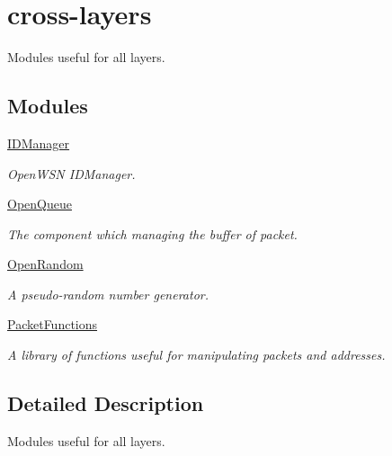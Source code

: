 \hypertarget{group__cross-layers}{}\section{cross-\/layers}
\label{group__cross-layers}


Modules useful for all layers.  


\subsection*{Modules}
\begin{DoxyCompactItemize}
\item 
\hyperlink{group___i_d_manager}{I\+D\+Manager}
\begin{DoxyCompactList}\small\item\em Open\+W\+SN I\+D\+Manager. \end{DoxyCompactList}\item 
\hyperlink{group___open_queue}{Open\+Queue}
\begin{DoxyCompactList}\small\item\em The component which managing the buffer of packet. \end{DoxyCompactList}\item 
\hyperlink{group___open_random}{Open\+Random}
\begin{DoxyCompactList}\small\item\em A pseudo-\/random number generator. \end{DoxyCompactList}\item 
\hyperlink{group___packet_functions}{Packet\+Functions}
\begin{DoxyCompactList}\small\item\em A library of functions useful for manipulating packets and addresses. \end{DoxyCompactList}\end{DoxyCompactItemize}


\subsection{Detailed Description}
Modules useful for all layers. 

